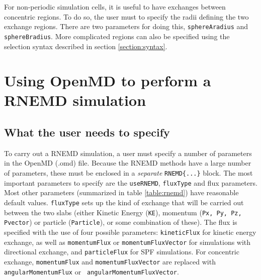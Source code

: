 \documentclass[letterpaper]{report}
\begin{document}
For non-periodic simulation cells, it is useful to have exchanges
between concentric regions. To do so, the user must to specify the
radii defining the two exchange regions. There are two parameters for
doing this, {\tt sphereAradius} and {\tt sphereBradius}.  More
complicated regions can also be specified using the selection syntax
described in section \ref{section:syntax}.

\section{\label{section:usingRNEMD}Using OpenMD to perform a RNEMD simulation}
\subsection{\label{section:rnemdParams} What the user needs to specify}

To carry out a RNEMD simulation, a user must specify a number of
parameters in the OpenMD (.omd) file.  Because the RNEMD methods have
a large number of parameters, these must be enclosed in a {\it
  separate} {\tt RNEMD\{...\}} block.  The most important parameters
to specify are the {\tt useRNEMD}, {\tt fluxType} and flux
parameters. Most other parameters (summarized in table
\ref{table:rnemd}) have reasonable default values.  {\tt fluxType}
sets up the kind of exchange that will be carried out between the two
slabs (either Kinetic Energy ({\tt KE}), momentum ({\tt Px, Py, Pz,
  Pvector}) or particle ({\tt Particle}), or some combination of
these).  The flux is specified with the use of four possible
parameters: {\tt kineticFlux} for kinetic energy exchange, as well as
{\tt momentumFlux} or {\tt momentumFluxVector} for simulations with
directional exchange, and {\tt particleFlux} for SPF simulations.  For
concentric exchange, {\tt momentumFlux} and {\tt momentumFluxVector}
are replaced with {\tt angularMomentumFlux} or {\tt
  angularMomentumFluxVector}.
\end{document}
